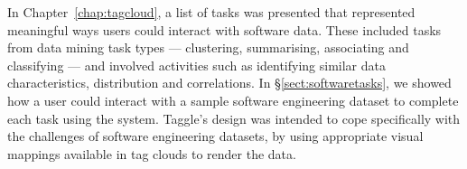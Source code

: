In Chapter~\ref{chap:tagcloud}, a list of tasks was presented that represented meaningful ways users could interact with software data. These included tasks from data mining task types --- clustering, summarising,  associating and classifying --- and involved activities such as identifying similar data characteristics, distribution and correlations. In \S\ref{sect:softwaretasks}, we showed how a user could interact with a sample software engineering dataset to complete each task using the system. Taggle's design was intended to cope specifically with the challenges of software engineering datasets, by using appropriate visual mappings available in tag clouds to render the data.



